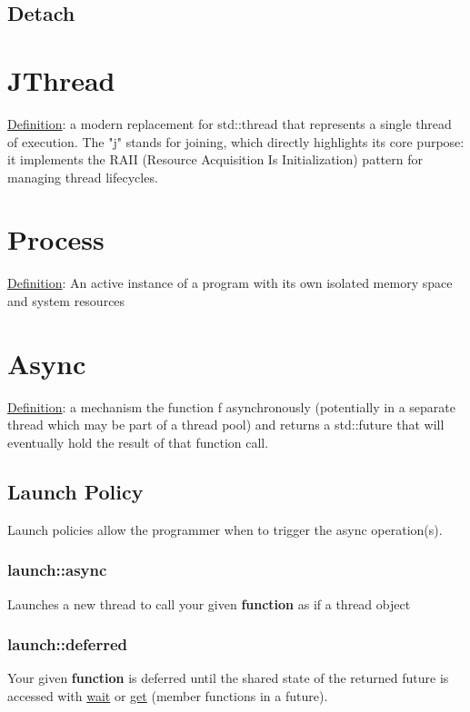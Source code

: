 \documentclass[twocolumn]{article}
\begin{document}
\subsection{Detach}

\section{JThread}
\underline{Definition}: a modern replacement for std::thread that represents a single thread of execution. The "j" stands for joining, which directly highlights its core purpose: it implements the RAII (Resource Acquisition Is Initialization) pattern for managing thread lifecycles.

\section{Process}
\underline{Definition}: An active instance of a program with its own isolated memory space and system resources 

\section{Async}
\underline{Definition}: a mechanism the function f asynchronously (potentially in a separate thread which may be part of a thread pool) and returns a std::future that will eventually hold the result of that function call.

\subsection{Launch Policy}
Launch policies allow the programmer when to trigger the async operation(s).

\subsubsection{launch::async}
Launches a new thread to call your given \textbf{function} as if a thread object 

\subsubsection{launch::deferred}
Your given \textbf{function} is deferred until the shared state of the returned future is accessed with \underline{wait} or \underline{get} (member functions in a future).
\end{document}
